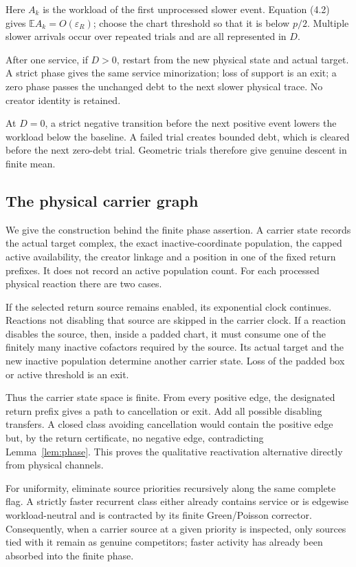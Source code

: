 \documentclass[11pt]{article}
\newcommand{\E}{\mathbb E}
\begin{document}
Here \(A_k\) is the workload of the first unprocessed slower event.
Equation (4.2) gives \(\E A_k=O(\varepsilon_R)\); choose the chart threshold
so that it is below \(p/2\).  Multiple slower arrivals occur over repeated
trials and are all represented in \(D\).

After one service, if \(D>0\), restart from the new physical state and actual
target.  A strict phase gives the same service minorization; loss of support
is an exit; a zero phase passes the unchanged debt to the next slower physical
trace.  No creator identity is retained.

At \(D=0\), a strict negative transition before the next positive event lowers
the workload below the baseline.  A failed trial creates bounded debt, which
is cleared before the next zero-debt trial.  Geometric trials therefore give
genuine descent in finite mean.


\subsection{The physical carrier graph}

We give the construction behind the finite phase assertion.  A carrier state
records the actual target complex, the exact inactive-coordinate population,
the capped active availability, the creator linkage and a position in one of
the fixed return prefixes.  It does not record an active population count.
For each processed physical reaction there are two cases.

If the selected return source remains enabled, its exponential clock
continues.  Reactions not disabling that source are skipped in the carrier
clock.  If a reaction disables the source, then, inside a padded chart, it
must consume one of the finitely many inactive cofactors required by the
source.  Its actual target and the new inactive population determine another
carrier state.  Loss of the padded box or active threshold is an exit.

Thus the carrier state space is finite.  From every positive edge, the
designated return prefix gives a path to cancellation or exit.  Add all
possible disabling transfers.  A closed class avoiding cancellation would
contain the positive edge but, by the return certificate, no negative edge,
contradicting Lemma~\ref{lem:phase}.  This proves the qualitative
reactivation alternative directly from physical channels.

For uniformity, eliminate source priorities recursively along the same
complete flag.  A strictly faster recurrent class either already contains
service or is edgewise workload-neutral and is contracted by its finite
Green/Poisson corrector.  Consequently, when a carrier source at a given
priority is inspected, only sources tied with it remain as genuine
competitors; faster activity has already been absorbed into the finite phase.
\end{document}
